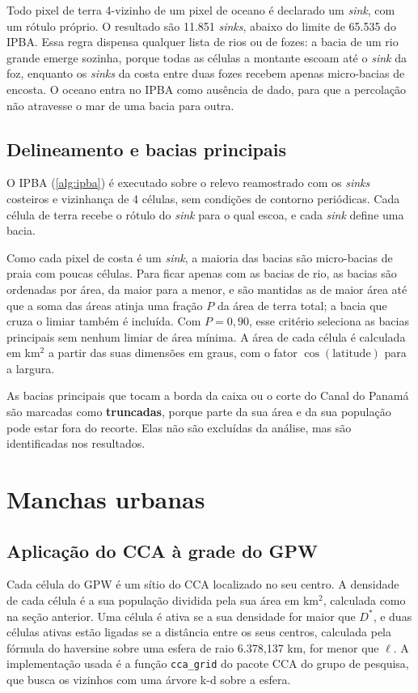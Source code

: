 Todo pixel de terra 4-vizinho de um pixel de oceano é declarado um \textit{sink}, com um rótulo próprio. O resultado são 11.851 \textit{sinks}, abaixo do limite de 65.535 do IPBA. Essa regra dispensa qualquer lista de rios ou de fozes: a bacia de um rio grande emerge sozinha, porque todas as células a montante escoam até o \textit{sink} da foz, enquanto os \textit{sinks} da costa entre duas fozes recebem apenas micro-bacias de encosta. O oceano entra no IPBA como ausência de dado, para que a percolação não atravesse o mar de uma bacia para outra.

\subsection{Delineamento e bacias principais}

O IPBA (\autoref{alg:ipba}) é executado sobre o relevo reamostrado com os \textit{sinks} costeiros e vizinhança de 4 células, sem condições de contorno periódicas. Cada célula de terra recebe o rótulo do \textit{sink} para o qual escoa, e cada \textit{sink} define uma bacia.

Como cada pixel de costa é um \textit{sink}, a maioria das bacias são micro-bacias de praia com poucas células. Para ficar apenas com as bacias de rio, as bacias são ordenadas por área, da maior para a menor, e são mantidas as de maior área até que a soma das áreas atinja uma fração $P$ da área de terra total; a bacia que cruza o limiar também é incluída. Com $P = 0{,}90$, esse critério seleciona as bacias principais sem nenhum limiar de área mínima. A área de cada célula é calculada em km$^2$ a partir das suas dimensões em graus, com o fator $\cos(\text{latitude})$ para a largura.

As bacias principais que tocam a borda da caixa ou o corte do Canal do Panamá são marcadas como \textbf{truncadas}, porque parte da sua área e da sua população pode estar fora do recorte. Elas não são excluídas da análise, mas são identificadas nos resultados.

\section{Manchas urbanas}
\label{sec:met-cca}

\subsection{Aplicação do CCA à grade do GPW}

Cada célula do GPW é um sítio do CCA localizado no seu centro. A densidade de cada célula é a sua população dividida pela sua área em km$^2$, calculada como na seção anterior. Uma célula é ativa se a sua densidade for maior que $D^{*}$, e duas células ativas estão ligadas se a distância entre os seus centros, calculada pela fórmula do haversine sobre uma esfera de raio 6.378,137 km, for menor que $\ell$. A implementação usada é a função \texttt{cca\_grid} do pacote CCA do grupo de pesquisa, que busca os vizinhos com uma árvore k-d sobre a esfera.

